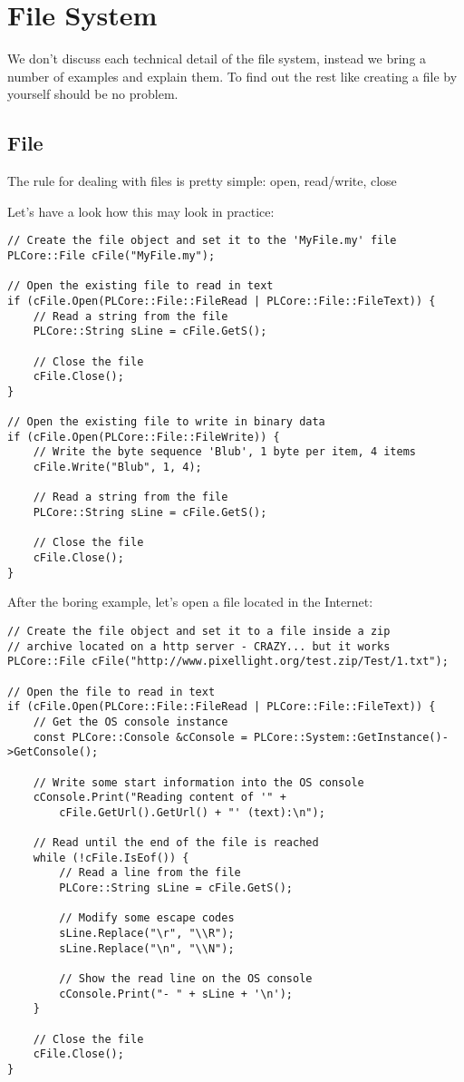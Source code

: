 \section{File System}
We don't discuss each technical detail of the file system, instead we bring a number of examples and explain them. To find out the rest like creating a file by yourself should be no problem.




\subsection{File}
The rule for dealing with files is pretty simple: open, read/write, close

Let's have a look how this may look in practice:

\begin{lstlisting}[caption=File usage example]
// Create the file object and set it to the 'MyFile.my' file
PLCore::File cFile("MyFile.my");

// Open the existing file to read in text
if (cFile.Open(PLCore::File::FileRead | PLCore::File::FileText)) {
	// Read a string from the file
	PLCore::String sLine = cFile.GetS();

	// Close the file
	cFile.Close();
}

// Open the existing file to write in binary data
if (cFile.Open(PLCore::File::FileWrite)) {
	// Write the byte sequence 'Blub', 1 byte per item, 4 items
	cFile.Write("Blub", 1, 4);

	// Read a string from the file
	PLCore::String sLine = cFile.GetS();

	// Close the file
	cFile.Close();
}
\end{lstlisting}

After the boring example, let's open a file located in the Internet:

\begin{lstlisting}[caption=http file usage example]
// Create the file object and set it to a file inside a zip
// archive located on a http server - CRAZY... but it works
PLCore::File cFile("http://www.pixellight.org/test.zip/Test/1.txt");

// Open the file to read in text
if (cFile.Open(PLCore::File::FileRead | PLCore::File::FileText)) {
	// Get the OS console instance
	const PLCore::Console &cConsole = PLCore::System::GetInstance()->GetConsole();

	// Write some start information into the OS console
	cConsole.Print("Reading content of '" +
		cFile.GetUrl().GetUrl() + "' (text):\n");

	// Read until the end of the file is reached
	while (!cFile.IsEof()) {
		// Read a line from the file
		PLCore::String sLine = cFile.GetS();

		// Modify some escape codes
		sLine.Replace("\r", "\\R");
		sLine.Replace("\n", "\\N");

		// Show the read line on the OS console
		cConsole.Print("- " + sLine + '\n');
	}

	// Close the file
	cFile.Close();
}
\end{lstlisting}




